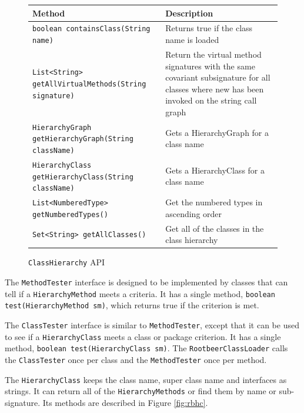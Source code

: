 \documentclass[preprint]{sigplanconf}
\begin{document}
\begin{figure}[htbf]
\begin{tabularx}{\textwidth}{|XX|}
\hline
{\bf Method} & {\bf Description }\\\hline
{\tt boolean containsClass(String name)} & Returns true if the 
    class name is loaded \\\hline
{\tt List<String> getAllVirtualMethods(String signature)} & 
    Return the virtual method signatures with the same 
    covariant subsignature for all classes where new has been 
    invoked on the string call graph\\\hline
{\tt HierarchyGraph getHierarchyGraph(String className)} & 
    Gets a HierarchyGraph for a class name\\\hline
{\tt HierarchyClass getHierarchyClass(String className)} & 
    Gets a HierarchyClass for a class name\\\hline 
{\tt List<NumberedType> getNumberedTypes()} & Get the 
    numbered types in ascending order\\\hline
{\tt Set<String> getAllClasses()} & Get all of the classes in the
    class hierarchy\\\hline
\end{tabularx}
\caption{{\tt ClassHierarchy} API}
\label{fig:rbch}
\end{figure}


The {\tt MethodTester} interface is designed to be implemented by classes that can tell if a {\tt HierarchyMethod} meets a criteria. It has a single method, {\tt boolean test(HierarchyMethod sm)}, which returns true if the criterion is met.

The {\tt ClassTester} interface is similar to {\tt MethodTester}, except that it can be used to see if a {\tt HierarchyClass} meets a class or package criterion. It has a single method, {\tt boolean test(Hierarchy\-Class sm)}. The {\tt RootbeerClassLoader} calls the {\tt ClassTester} once per class and the {\tt MethodTester} once per method.

The {\tt HierarchyClass} keeps the class name, super class name and interfaces as strings. It can return all of the {\tt HierarchyMethods} or find them by name or sub-signature. Its methods are described in Figure \ref{fig:rbhc}.
\end{document}
